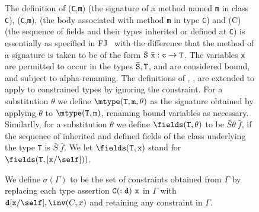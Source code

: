 \begin{figure*}
The definition of {\mtype({\tt C},{\tt m})} (the signature of a method
named {\tt m} in class {\tt C}), {\mbody({\tt C},{\tt m})}, (the body
associated with method {\tt m} in type {\tt C}) and \fields(C) (the
sequence of fields and their types inherited or defined at {\tt C}) is
essentially as specified in FJ~\cite{FJ} with the difference that the
method of a signature is taken to be of the form $\bar{\tt S}\ \bar{\tt
x}: {\tt c} \rightarrow {\tt T}$.  The variables {\tt x} are permitted
to occur in the types $\bar{\tt S},{\tt T}$, and are considered bound,
and subject to alpha-renaming.  The definitions of \mtype, \mbody,
\fields{} are extended to apply to constrained types by ignoring the
constraint.  For a substitution $\theta$ we define $\mtype({\tt
T},{\tt m},\theta)$ as the signature obtained by applying $\theta$ to
$\mtype({\tt T},{\tt m})$, renaming bound variables as necessary.
Similarlly, for a substitution $\theta$ we define $\fields({\tt
T},\theta)$ to be $\bar{S}\theta\ \bar{f}$, if the sequence of
inherited and defined fields of the class underlying the type {\tt T}
is $\bar{S}\ \bar{f}$. We let $\fields({\tt T},{\tt x})$ stand for
$\fields({\tt T},[{\tt x}/\self]))$.

We define $\sigma(\Gamma)$ to be the set of
constraints obtained from $\Gamma$ by replacing each type assertion
${\tt C(:d)\ x}$ in $\Gamma$ with ${\tt d}[{\tt x}/\self],\inv(C,x)$
and retaining any constraint in $\Gamma$.


\end{figure*}
